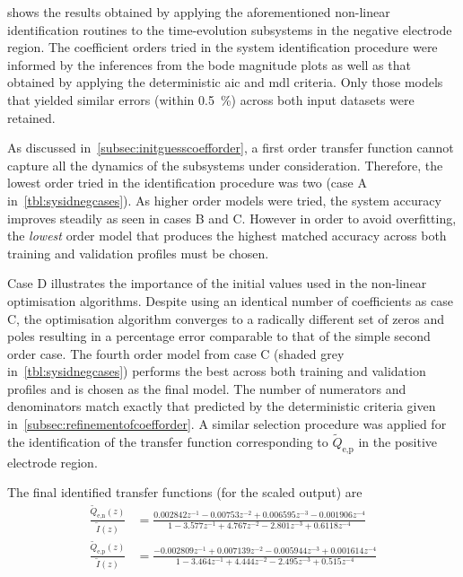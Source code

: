 

   shows   the   results  obtained   by   applying   the
aforementioned   non-linear  identification   routines  to   the  time-evolution
subsystems in the negative electrode region. The coefficient orders tried in the
system identification  procedure were informed  by the inferences from  the bode
magnitude plots as well as that obtained by applying the deterministic \gls{aic}
and \gls{mdl}  criteria. Only those  models that yielded similar  errors (within
\SI{0.5}{\percent}) across both input datasets were retained.

As  discussed  in~\cref{subsec:initguesscoefforder},   a  first  order  transfer
function cannot capture all the  dynamics of the subsystems under consideration.
Therefore, the lowest order tried in  the identification procedure was two (case
A in~\cref{tbl:sysidnegcases}).  As higher order  models were tried,  the system
accuracy improves steadily as  seen in cases B and C. However  in order to avoid
overfitting, the  \emph{lowest} order  model that  produces the  highest matched
accuracy across both training and validation profiles must be chosen.

Case D illustrates  the importance of the initial values  used in the non-linear
optimisation algorithms.  Despite using an  identical number of  coefficients as
case C,  the optimisation algorithm  converges to  a radically different  set of
zeros  and  poles  resulting  in  a  percentage  error  comparable  to  that  of
the  simple second  order  case. The  fourth  order model  from  case C  (shaded
grey  in~\cref{tbl:sysidnegcases}) performs  the best  across both  training and
validation profiles and  is chosen as the final model.  The number of numerators
and  denominators match  exactly that  predicted by  the deterministic  criteria
given in~\cref{subsec:refinementofcoefforder}. A similar selection procedure was
applied  for  the  identification  of the  transfer  function  corresponding  to
$\widetilde{Q}_{\text{e,p}}$ in the positive electrode region.

The final identified transfer functions (for the scaled output) are
\begin{align}
    \frac{\widetilde{Q}_{\text{e,n}}(z)}{\widetilde{I}(z)} & = \frac{0.002842 z^{-1} - 0.00753 z^{-2} + 0.006595 z^{-3} - 0.001906 z^{-4}}{1 - 3.577 z^{-1} + 4.767 z^{-2} - 2.801 z^{-3} + 0.6118 z^{-4}} \label{eq:finaldisctfneg}\\
    \frac{\widetilde{Q}_{\text{e,p}}(z)}{\widetilde{I}(z)} & = \frac{-0.002809 z^{-1} + 0.007139 z^{-2} - 0.005944 z^{-3} + 0.001614 z^{-4}}{1 - 3.464 z^{-1} + 4.444 z^{-2} - 2.495 z^{-3} + 0.515 z^{-4}}\label{eq:finaldisctfpos}
\end{align}

